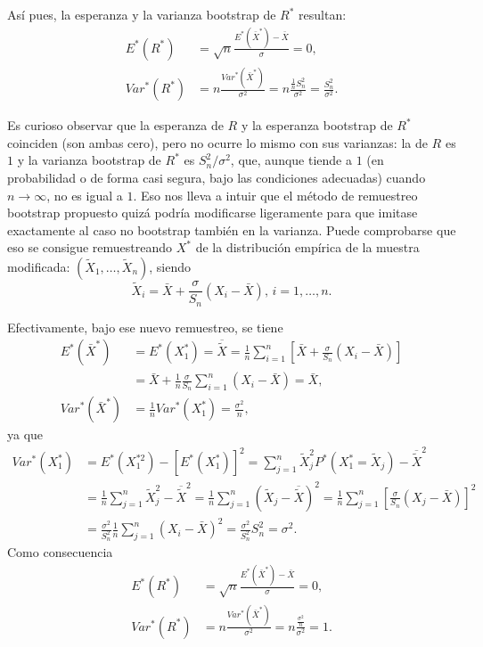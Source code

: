\documentclass[]{book}
\theoremstyle{break}
\theoremstyle{definition}
\theoremstyle{definition}
\theoremstyle{definition}
\theoremstyle{remark}
\begin{document}
Así pues, la esperanza y la varianza bootstrap de \(R^{\ast}\) resultan:
\[\begin{aligned}
E^{\ast}\left( R^{\ast} \right) &= \sqrt{n}\frac{E^{\ast}\left( \bar{X}^{\ast} \right) -\bar{X}}{\sigma }=0, \\
Var^{\ast}\left( R^{\ast} \right) &= n\frac{Var^{\ast}\left( \bar{X}^{\ast} \right)}{\sigma^2}=n\frac{\frac{1}{n}S_n^2}{\sigma^2}=
\frac{S_n^2}{\sigma^2}.
\end{aligned}\]

Es curioso observar que la esperanza de \(R\) y la esperanza bootstrap
de \(R^{\ast}\) coinciden (son ambas cero), pero no ocurre lo mismo con
sus varianzas: la de \(R\) es \(1\) y la varianza bootstrap de
\(R^{\ast}\) es \(S_n^2/\sigma^2\), que, aunque tiende a \(1\) (en
probabilidad o de forma casi segura, bajo las condiciones adecuadas)
cuando \(n\rightarrow \infty\), no es igual a \(1\). Eso nos lleva a
intuir que el método de remuestreo bootstrap propuesto quizá podría
modificarse ligeramente para que imitase exactamente al caso no
bootstrap también en la varianza. Puede comprobarse que eso se consigue
remuestreando \(X^{\ast}\) de la distribución empírica de la muestra
modificada: \(\left( \tilde{X}_1,\ldots ,\tilde{X}_n \right)\), siendo
\[\tilde{X}_i=\bar{X}+\frac{\sigma }{S_n}\left( X_i-\bar{X}
 \right) \text{, }i=1,\ldots ,n.\]

Efectivamente, bajo ese nuevo remuestreo, se tiene \[\begin{aligned}
E^{\ast}\left( \bar{X}^{\ast} \right) &= E^{\ast}\left( X_1^{\ast
} \right) =\overline{\tilde{X}}=\frac{1}{n}\sum_{i=1}^{n}\left[ \bar{X}+
\frac{\sigma }{S_n}\left( X_i-\bar{X} \right) \right] \\
&= \bar{X}+\frac{1}{n}\frac{\sigma }{S_n}\sum_{i=1}^{n}\left( X_i-
\bar{X} \right) =\bar{X}, \\
Var^{\ast}\left( \bar{X}^{\ast} \right) &= \frac{1}{n}Var^{\ast
}\left( X_1^{\ast} \right) =\frac{\sigma^2}{n},
\end{aligned}\] ya que \[\begin{aligned}
Var^{\ast}\left( X_1^{\ast} \right) &= E^{\ast}\left( X_1^{\ast
2} \right) -\left[ E^{\ast}\left( X_1^{\ast} \right) \right]
^2=\sum_{j=1}^{n}\tilde{X}_j^2P^{\ast}\left( X_1^{\ast}=\tilde{X}
_j \right) -\overline{\tilde{X}}^2 \\
&= \frac{1}{n}\sum_{j=1}^{n}\tilde{X}_j^2-\overline{\tilde{X}}^2=\frac{
1}{n}\sum_{j=1}^{n}\left( \tilde{X}_j-\overline{\tilde{X}} \right)^2=
\frac{1}{n}\sum_{j=1}^{n}\left[ \frac{\sigma }{S_n}\left( X_j-\bar{X} \right) \right]^2 \\
&= \frac{\sigma^2}{S_n^2}\frac{1}{n}\sum_{j=1}^{n}\left( X_i-
\bar{X} \right)^2=\frac{\sigma^2}{S_n^2}S_n^2=\sigma^2.
\end{aligned}\] Como consecuencia \[\begin{aligned}
E^{\ast}\left( R^{\ast} \right) &= \sqrt{n}\frac{E^{\ast}\left( 
\bar{X}^{\ast} \right) -\bar{X}}{\sigma }=0, \\
Var^{\ast}\left( R^{\ast} \right) &= n\frac{Var^{\ast}\left( 
\bar{X}^{\ast} \right)}{\sigma^2}=n\frac{\frac{\sigma^2}{n}}{\sigma^2}
=1.
\end{aligned}\]
\end{document}

